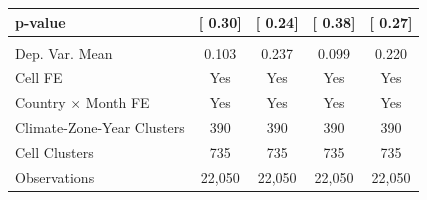 {\begin{tabular}{l*{4}{c}}
\hspace{15pt} p-value&[     0.30]         &[     0.24]         &[     0.38]         &[     0.27]         \\
\hline \\ Dep. Var. Mean& 0.103         & 0.237         & 0.099         & 0.220         \\
Cell FE             &   Yes         &   Yes         &   Yes         &   Yes         \\
Country $\times$ Month FE&   Yes         &   Yes         &   Yes         &   Yes         \\
Climate-Zone-Year Clusters&   390         &   390         &   390         &   390         \\
Cell Clusters       &   735         &   735         &   735         &   735         \\
Observations        &22,050         &22,050         &22,050         &22,050         \\
\bottomrule
\end{tabular}
}
